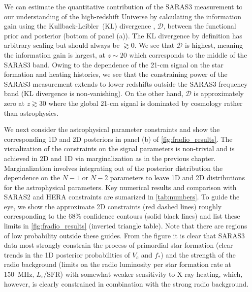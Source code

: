 We can estimate the quantitative contribution of the SARAS3 measurement to our understanding of the high-redshift Universe by calculating the information gain using the Kullback-Leibler~(KL) divergence \cite{kullback_information_1951}, $\mathcal{D}$,  between the functional prior and posterior (bottom of panel (a)). The KL divergence by definition has arbitrary scaling but should always be $\gtrsim 0$. We see that $\mathcal{D}$ is highest, meaning the information gain is largest, at $z\sim 20$ which corresponds to the middle of the SARAS3 band. Owing to the dependence of the 21-cm signal on the star formation and heating histories, we see that the constraining power of the SARAS3 measurement extends to lower redshifts outside the SARAS3 frequency band (KL divergence is non-vanishing). On the other hand,  $\mathcal{D}$  is approximately zero at $z\gtrsim 30$ where the global 21-cm signal is dominated by cosmology rather than astrophysics.

We next consider the astrophysical parameter constraints and show the corresponding 1D and 2D posteriors in panel (b) of \cref{fig:fradio_results}. The visualization of the constraints on the signal parameters is non-trivial and is achieved in 2D and 1D via marginalization as in the previous chapter. Marginalization involves integrating out of the posterior distribution the dependence on the $N-1$ or $N-2$ parameters to leave 1D and 2D distributions for the astrophysical parameters. Key numerical results and comparison with SARAS2 \cite{Bevins_SARAS2_2022} and HERA \cite{HERA_2022b} constraints are sumarized in \cref{tab:numbers}. To guide the eye, we show the approximate 2D constraints (red dashed lines) roughly corresponding to the 68\% confidence contours (solid black lines) and list these limits in \cref{fig:fradio_results} (inverted triangle table). Note that there are regions of low probability outside these guides. From the figure it is clear that SARAS3 data most strongly constrain the process of primordial star formation (clear trends in the 1D posterior probabilities of $V_c$ and $f_*$) and the strength of the radio background (limits on the radio luminosity per star formation rate at 150~MHz, $L_\mathrm{r}/\mathrm{SFR}$) with somewhat weaker sensitivity to X-ray heating, which, however, is clearly constrained in combination with the strong radio background.

